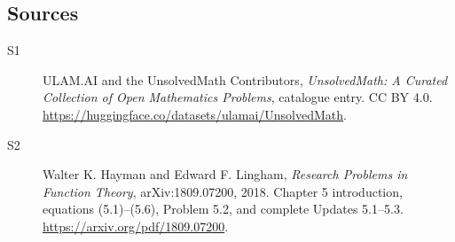 \documentclass[11pt]{book}
\begin{document}
\subsection{Sources}
\begin{description}
\item[\hypertarget{source:statement:1}{S1}] ULAM.AI and the UnsolvedMath Contributors, \emph{UnsolvedMath: A Curated Collection of Open Mathematics Problems}, catalogue entry. CC BY 4.0. \url{https://huggingface.co/datasets/ulamai/UnsolvedMath}.
\item[\hypertarget{source:statement:2}{S2}] Walter K. Hayman and Edward F. Lingham, \emph{Research Problems in Function Theory}, arXiv:1809.07200, 2018. Chapter 5 introduction, equations (5.1)--(5.6), Problem 5.2, and complete Updates 5.1--5.3. \url{https://arxiv.org/pdf/1809.07200}.
\end{description}
\label{end:statement}
\end{document}
